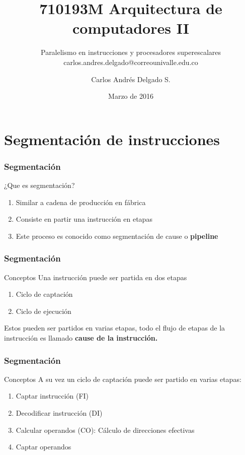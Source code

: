 \documentclass{beamer}
\author{Carlos Andr\'es Delgado S.}
\title{710193M Arquitectura de computadores II}
\subtitle{Paralelismo en instrucciones y procesadores superescalares \\ carlos.andres.delgado@correounivalle.edu.co}
\institute{Facultad de Ingeniería. Universidad del Valle}
\date{Marzo de 2016}
\begin{document}
\begin{frame}
	\titlepage	 		
\end{frame}

\begin{frame}
	\tableofcontents	 		
\end{frame}


\section{Segmentación de instrucciones}

\begin{frame}
	\frametitle{Segmentación}
	\begin{block}{¿Que es segmentación?}
	\begin{enumerate}
		\item Similar a cadena de producción en fábrica
		\item Consiste en partir una instrucción en etapas
		\item Este proceso es conocido como segmentación de cause o \textbf{pipeline}
	\end{enumerate}	
	\end{block}		 		
\end{frame}

\begin{frame}
	\frametitle{Segmentación}
	\begin{block}{Conceptos}
	Una instrucción puede ser partida en dos etapas
	\begin{enumerate}
		\item Ciclo de captación
		\item Ciclo de ejecución
	\end{enumerate}	
	Estos pueden ser partidos en varias etapas, todo el flujo de etapas de la instrucción es llamado \textbf{cause de la instrucción.}
	\end{block}		 		
\end{frame}

\begin{frame}
	\frametitle{Segmentación}
	\begin{block}{Conceptos}
	A su vez un ciclo de captación puede ser partido en varias etapas:
	\begin{enumerate}
		\item Captar instrucción (FI)
		\item Decodificar instrucción (DI)
		\item Calcular operandos (CO): Cálculo de direcciones efectivas
		\item Captar operandos
	\end{enumerate}	
	\end{block}		 		
\end{frame}
\end{document}
